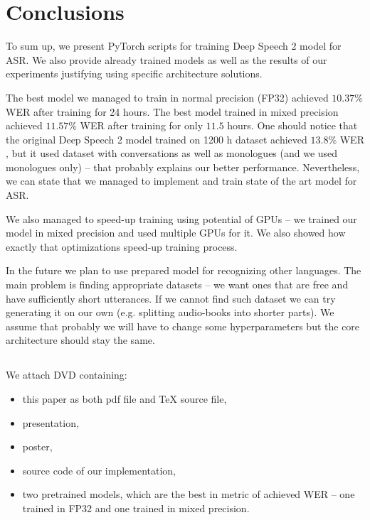 \documentclass[licencjacka,en]{pracamgr}
\begin{document}
	
	\chapter{Conclusions}\label{r:concls}
	
	To sum up, we present PyTorch scripts for training Deep Speech 2 model for ASR. We also provide already trained models as well as the results of our experiments justifying using specific architecture solutions.
	
	The best model we managed to train in normal precision (FP32) achieved $10.37$\% WER after training for 24 hours. The best model trained in mixed precision achieved $11.57$\% WER after training for only $11.5$ hours. One should notice that the original Deep Speech 2 model trained on 1200 h dataset achieved $13.8$\% WER \cite{DS2}, but it used dataset with conversations as well as monologues (and we used monologues only) -- that probably explains our better performance. Nevertheless, we can state that we managed to implement and train state of the art model for ASR.
	
	We also managed to speed-up training using potential of GPUs -- we trained our model in mixed precision and used multiple GPUs for it. We also showed how exactly that optimizations speed-up training process.
	
	In the future we plan to use prepared model for recognizing other languages. The main problem is finding appropriate datasets -- we want ones that are free and have sufficiently short utterances. If we cannot find such dataset we can try generating it on our own (e.g. splitting audio-books into shorter parts). We assume that probably we will have to change some hyperparameters but the core architecture should stay the same.
	
	\begin{appendices}
		
		\chapter{}
		
		We attach DVD containing: 
		
		\begin{itemize}
			\item this paper as both pdf file and TeX source file,
			\item presentation,
			\item poster,
			\item source code of our implementation,
			\item two pretrained models, which are the best in metric of achieved WER -- one trained in FP32 and one trained in mixed precision.
		\end{itemize}
		
	\end{appendices}
	
\end{document}
